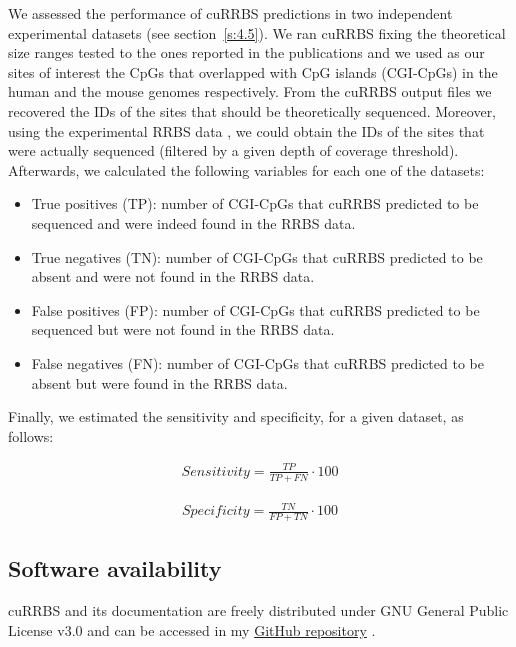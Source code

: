 We assessed the performance of cuRRBS predictions in two independent experimental datasets \citep{Tanas2017,Lim2016} (see section~\ref{s:4.5}). We ran cuRRBS fixing the theoretical size ranges tested to the ones reported in the publications \citep{Tanas2017,Lim2016} and we used as our sites of interest the CpGs that overlapped with CpG islands (CGI-CpGs) in the human \citep{Tanas2017} and the mouse genomes \citep{Lim2016} respectively. From the cuRRBS output files we recovered the IDs of the sites that should be theoretically sequenced. Moreover, using the experimental RRBS data \citep{Tanas2017,Lim2016}, we could obtain the IDs of the sites that were actually sequenced (filtered by a given depth of coverage threshold). Afterwards, we calculated the following variables for each one of the datasets:

\begin{itemize}
	
	\item True positives (TP): number of CGI-CpGs that cuRRBS predicted to be sequenced and were indeed found in the RRBS data.
	
	\item True negatives (TN): number of CGI-CpGs that cuRRBS predicted to be absent and were not found in the RRBS data.
	
	\item False positives (FP): number of CGI-CpGs that cuRRBS predicted to be sequenced but were not found in the RRBS data.
	
	\item False negatives (FN): number of CGI-CpGs that cuRRBS predicted to be absent but were found in the RRBS data.
	
\end{itemize}

Finally, we estimated the sensitivity and specificity, for a given dataset, as follows:

\begin{align}
Sensitivity = \frac{TP}{TP+FN} \cdot 100
\end{align}

\begin{align}
Specificity = \frac{TN}{FP+TN} \cdot 100
\end{align}

\subsection*{Software availability}

cuRRBS and its documentation are freely distributed under GNU General Public License v3.0 and can be accessed in my \href{https://github.com/demh/cuRRBS/}{GitHub repository} \citep{Martin-Herranz2017}.